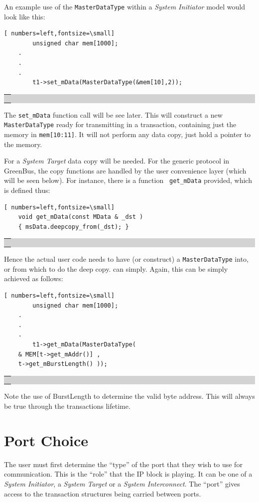 \documentclass[12pt,oneside]{gsbook}
\newcommand{\master}{{\em System Initiator}\xspace}
\newcommand{\slave}{{\em System Target}\xspace}
\newcommand{\router}{{\em System Interconnect}\xspace}
\def\example#1{\begin{center}\colorbox{lightgrey}{\begin{tabular}{|p{0.6\paperwidth}|}\hline\\#1\\ \\ \hline\end{tabular}}\end{center}}
\newenvironment{exampleenv}{\begin{lrbox}{\examplebox}\begin{minipage}{0.6\paperwidth}}{\end{minipage}\end{lrbox}\example{\usebox{\examplebox}}}
\begin{document}
An example use of the {\tt MasterDataType} within a \master model
would look like this:
\begin{exampleenv}
\begin{Verbatim}[ numbers=left,fontsize=\small]
        unsigned char mem[1000];
	.
	.
	.
        t1->set_mData(MasterDataType(&mem[10],2));
\end{Verbatim}
\end{exampleenv}

The {\tt set\_mData} function call will be see later. This will
construct a new {\tt MasterDataType} ready for transmitting in a
transaction, containing just the memory in {\tt mem[10:11]}. It will
not perform any data copy, just hold a pointer to the memory.

For a \slave data copy will be needed. For the generic protocol in
GreenBus, the copy functions are handled by the user convenience layer
(which will be seen below). For instance, there is a function {\tt
get\_mData} provided, which is defined thus:
\begin{exampleenv}
\begin{Verbatim}[ numbers=left,fontsize=\small]
    void get_mData(const MData & _dst ) 
	{ msData.deepcopy_from(_dst); }
\end{Verbatim}
\end{exampleenv}

Hence the actual user code needs to have (or construct) a
{\tt MasterDataType} into, or from which to do the deep copy.
can simply. Again, this can be simply achieved as follows:
\begin{exampleenv}
\begin{Verbatim}[ numbers=left,fontsize=\small]
        unsigned char mem[1000];
	.
	.
	.
        t1->get_mData(MasterDataType( 
	& MEM[t->get_mAddr()] ,
	t->get_mBurstLength() ));
\end{Verbatim}
\end{exampleenv}

Note the use of BurstLength to determine the valid byte address. This
will always be true through the transactions lifetime. 



\section{Port Choice}
\label{PORTCHOICE}
The user must first determine the ``type'' of the port that they wish to use for communication. This
is the ``role'' that the IP block is playing. It can be one of a \master, a \slave or a
\router. The ``port'' gives access to the transaction structures being carried between ports. 
\end{document}
